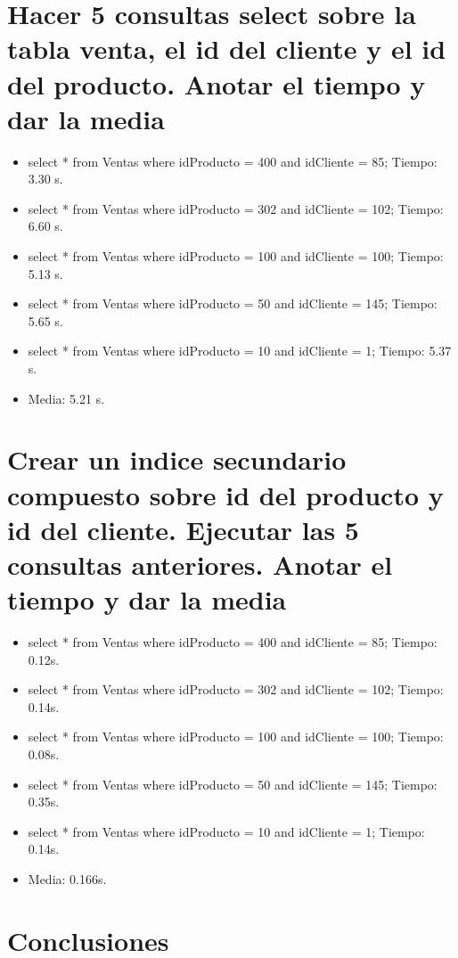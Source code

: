 \documentclass[a4paper,12pt]{article}
\begin{document}
  \section{Hacer 5 consultas select sobre la tabla venta, el id del cliente y el id del producto. Anotar el tiempo y dar la media}
  
  \begin{itemize}
   \item select * from Ventas where idProducto = 400 and idCliente = 85; Tiempo: 3.30 s.
   \item select * from Ventas where idProducto = 302 and idCliente = 102; Tiempo: 6.60 s.
   \item select * from Ventas where idProducto = 100 and idCliente = 100; Tiempo: 5.13 s.
   \item select * from Ventas where idProducto = 50 and idCliente = 145; Tiempo: 5.65 s.
   \item select * from Ventas where idProducto = 10 and idCliente = 1; Tiempo: 5.37 s.
   \item Media: 5.21 s.
  \end{itemize}

  \section{Crear un indice secundario compuesto sobre id del producto y id del cliente.
  Ejecutar las 5 consultas anteriores. Anotar el tiempo y dar la media}
  
  \begin{itemize}
   \item select * from Ventas where idProducto = 400 and idCliente = 85; Tiempo: 0.12s.
   \item select * from Ventas where idProducto = 302 and idCliente = 102; Tiempo: 0.14s.
   \item select * from Ventas where idProducto = 100 and idCliente = 100; Tiempo: 0.08s.
   \item select * from Ventas where idProducto = 50 and idCliente = 145; Tiempo: 0.35s.
   \item select * from Ventas where idProducto = 10 and idCliente = 1; Tiempo: 0.14s.
   \item Media: 0.166s.
  \end{itemize}
  
  \section{Conclusiones}
    
\end{document}
